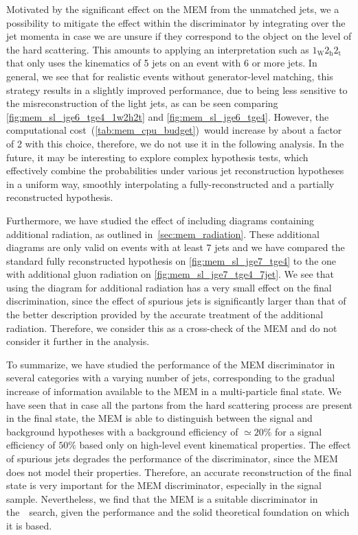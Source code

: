 Motivated by the significant effect on the MEM from the unmatched jets, we a possibility to mitigate the effect within the discriminator by integrating over the jet momenta in case we are unsure if they correspond to the object on the level of the hard scattering. This amounts to applying an interpretation such as $1_{\mathrm{W}} 2_{\mathrm{h}} 2_{\mathrm{t}}$ that only uses the kinematics of 5 jets on an event with 6 or more jets. In general, we see that for realistic events without generator-level matching, this strategy results in a slightly improved performance, due to being less sensitive to the misreconstruction of the light jets, as can be seen comparing \cref{fig:mem_sl_jge6_tge4_1w2h2t} and \cref{fig:mem_sl_jge6_tge4}. However, the computational cost~(\cref{tab:mem_cpu_budget})~would increase by about a factor of 2 with this choice, therefore, we do not use it in the following analysis. In the future, it may be interesting to explore complex hypothesis tests, which effectively combine the probabilities under various jet reconstruction hypotheses in a uniform way, smoothly interpolating a fully-reconstructed and a partially reconstructed hypothesis.

Furthermore, we have studied the effect of including diagrams containing additional radiation, as outlined in~\cref{sec:mem_radiation}. These additional diagrams are only valid on events with at least 7 jets and we have compared the standard fully reconstructed hypothesis on \cref{fig:mem_sl_jge7_tge4} to the one with additional gluon radiation on \cref{fig:mem_sl_jge7_tge4_7jet}. We see that using the diagram for additional radiation has a very small effect on the final discrimination, since the effect of spurious jets is significantly larger than that of the better description provided by the accurate treatment of the additional radiation. Therefore, we consider this as a cross-check of the MEM and do not consider it further in the analysis.

To summarize, we have studied the performance of the MEM discriminator in several categories with a varying number of jets, corresponding to the gradual increase of information available to the MEM in a multi-particle final state. We have seen that in case all the partons from the hard scattering process are present in the final state, the MEM is able to distinguish between the signal and background hypotheses with a background efficiency of $\simeq 20\%$ for a signal efficiency of $50\%$ based only on high-level event kinematical properties. The effect of spurious jets degrades the performance of the discriminator, since the MEM does not model their properties. Therefore, an accurate reconstruction of the final state is very important for the MEM discriminator, especially in the signal sample. Nevertheless, we find that the MEM is a suitable discriminator in the~\ttHbb~search, given the performance and the solid theoretical foundation on which it is based.

